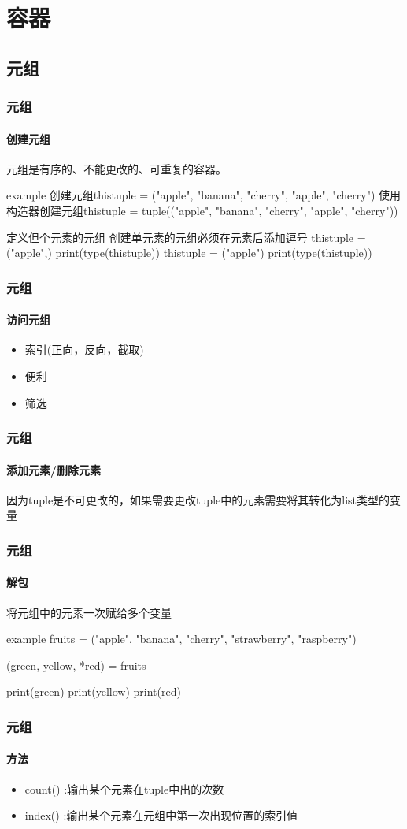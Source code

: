 \documentclass{beamer}
\begin{document}
\section{容器}

\subsection{元组}

\begin{frame}
	\frametitle{元组}
	\framesubtitle{创建元组}
	元组是有序的、不能更改的、可重复的容器。
	\pause
	\begin{block}{example}
		创建元组thistuple = ("apple", "banana", "cherry", "apple", "cherry")
		使用构造器创建元组thistuple = tuple(("apple", "banana", "cherry", "apple", "cherry"))
	\end{block}
	\pause
	\begin{alertblock}{定义但个元素的元组}
		创建单元素的元组必须在元素后添加逗号
		thistuple = ("apple",)
		print(type(thistuple))
		thistuple = ("apple")
		print(type(thistuple))
	\end{alertblock}

\end{frame}
\begin{frame}
	\frametitle{元组}
	\framesubtitle{访问元组}
	\begin{itemize}
		\item 索引(正向，反向，截取)
		\item 便利
		\item 筛选
	\end{itemize}
\end{frame}

\begin{frame}
	\frametitle{元组}
	\framesubtitle{添加元素/删除元素}
	因为tuple是不可更改的，如果需要更改tuple中的元素需要将其转化为list类型的变量

\end{frame}

\begin{frame}
	\frametitle{元组}
	\framesubtitle{解包}
	将元组中的元素一次赋给多个变量
	\begin{block}{example}
		fruits = ("apple", "banana", "cherry", "strawberry", "raspberry")

		(green, yellow, *red) = fruits

		print(green)
		print(yellow)
		print(red)
	\end{block}
\end{frame}
\begin{frame}[t]
	\frametitle{元组}
	\framesubtitle{方法}
	\begin{itemize}
		\item count() :输出某个元素在tuple中出的次数
		\item index() :输出某个元素在元组中第一次出现位置的索引值
	\end{itemize}

\end{frame}
\end{document}
